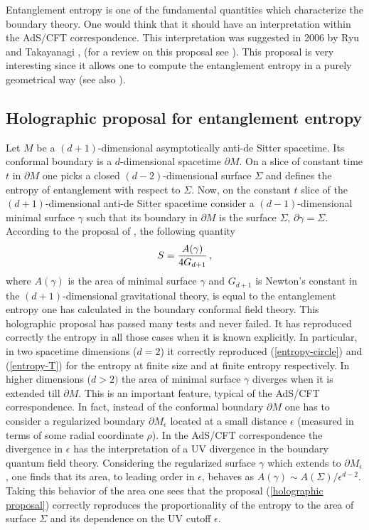 \documentclass[12pt]{article}
\def\be{\begin{eqnarray}}
\def\ee{\end{eqnarray}}
\def\lb{\label}
\begin{document}
Entanglement entropy is one of the fundamental quantities which characterize the boundary theory. One would think that it  should have an interpretation within the AdS/CFT correspondence. This interpretation was suggested in 2006 by Ryu and Takayanagi  \cite{Ryu:2006bv}, \cite{Ryu:2006ef} (for a review on this proposal see \cite{Nishioka:2009un}).
This proposal is very interesting since it allows one to compute the entanglement entropy in a purely geometrical way (see also \cite{Fursaev:2006ih}).

\subsection{Holographic proposal for entanglement entropy}

Let $M$ be a $(d+1)$-dimensional asymptotically anti-de Sitter spacetime. Its conformal boundary is a $d$-dimensional spacetime $\partial M$. On a slice of constant time $t$ in $\partial M$ one picks a closed $(d-2)$-dimensional surface $\Sigma$ and defines the entropy of entanglement with respect to $\Sigma$. Now, on the constant $t$ slice of  the $(d+1)$-dimensional anti-de Sitter spacetime consider a $(d-1)$-dimensional minimal surface $\gamma$ such that its boundary in $\partial M$ is the surface $\Sigma$, $\partial\gamma=\Sigma$. According to the proposal of \cite{Ryu:2006bv}, \cite{Ryu:2006ef}
the following quantity
\be
S={A(\gamma)\over 4 G_{d+1}}\, ,
\lb{holographic proposal}
\ee
where $A(\gamma)$ is the area of minimal surface $\gamma$ and $G_{d+1}$ is Newton's constant in the $(d+1)$-dimensional gravitational theory, is equal to the entanglement entropy one has calculated in the boundary conformal field theory. This holographic proposal has passed many tests and never failed. It has reproduced correctly the entropy in all those cases when it is known explicitly. In particular,  in two spacetime dimensions ($d=2$) it correctly reproduced (\ref{entropy-circle}) and (\ref{entropy-T}) for the entropy at finite size
and at finite entropy respectively. In higher dimensions ($d>2)$ the area of minimal surface $\gamma$ diverges when it is extended till $\partial M$. This is an important feature, typical of the AdS/CFT correspondence. In fact, instead of the conformal boundary $\partial M$ one has to consider a regularized boundary $\partial M_\epsilon$ located  at a small distance $\epsilon$ (measured in 
terms of some radial coordinate $\rho$). In the AdS/CFT correspondence the divergence in $\epsilon$ has the interpretation of a UV divergence in the boundary quantum field theory. 
Considering the regularized surface $\gamma$ which extends to $\partial M_\epsilon$, one finds that its area, to leading order in $\epsilon$, behaves as $A(\gamma)\sim A(\Sigma)/\epsilon^{d-2}$.
Taking this behavior of the area one sees that 
the proposal (\ref{holographic proposal}) correctly reproduces the proportionality  of the entropy 
to the area of surface $\Sigma$ and its dependence on the UV cutoff $\epsilon$.
\end{document}
